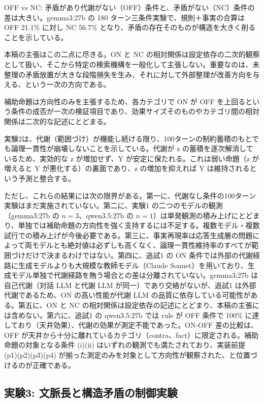 \documentclass[12pt,a4paper]{article}
\begin{document}
OFF vs NC: 矛盾があり代謝がない（OFF）条件と、矛盾がない（NC）条件の差は大きい。gemma3:27b の 180 ターン三条件実験で、規則＋事実の合算は OFF 21.1\% に対し NC 56.7\% となり、矛盾の存在そのものが構造を大きく削ることを示している。

本稿の主張はこの二点に尽きる。ON と NC の相対関係は設定依存の二次的観察として扱い、そこから特定の検索機構を一般化して主張しない。重要なのは、未整理の矛盾放置が大きな段階損失を生み、それに対して外部整理が改善方向を与える、という一次の方向である。

補助命題は方向性のみを主張するため、各カテゴリで ON が OFF を上回るという条件の成否が一次の検証項目であり、効果サイズそのものやカテゴリ間の相対関係は二次的な記述にとどまる。

実験2は、代謝（範囲づけ）が機能し続ける限り、100ターンの制約蓄積のもとでも論理一貫性が崩壊しないことを示している。代謝が z の蓄積を逐次解消しているため、実効的な z が増加せず、Y が安定に保たれる。これは弱い命題（z が増えると Y が悪化する）の裏面であり、z の増加を抑えれば Y は維持されるという予測と整合する。

ただし、これらの結果には次の限界がある。第一に、代謝なし条件の100ターン実験はまだ実施されていない。第二に、実験1 の二つのモデルの観測（gemma3:27b の \(n=3\)、qwen3.5:27b の \(n=1\)）は単発観測の積み上げにとどまり、単独では補助命題の方向性を強く支持するには不足する。複数モデル・複数試行での積み上げが今後必要である。第三に、事実再現率は応答生成層の問題によって両モデルとも絶対値は必ずしも高くなく、論理一貫性維持率のすべてが範囲づけだけで決まるわけではない。第四に、追試1 の ON 条件では外部の代謝経路に生成モデルよりも大規模な教師モデル（Claude Sonnet）を用いており、生成モデル単独で代謝経路を賄う場合との差は分離されていない。gemma3:27b は自己代謝（対話 LLM と代謝 LLM が同一）であり交絡がないが、追試1 は外部代謝であるため、ON の高い性能が代謝 LLM の品質に依存している可能性がある。第五に、ON と NC の相対関係は設定依存の記述にとどまり、本稿の主張には含めない。第六に、追試1 の qwen3.5:27b では rule が OFF 条件で 100\% に達しており（天井効果）、代謝の効果が測定不能であった。ON-OFF 差の比較は、OFF が天井から十分に離れているカテゴリ（contra、fact）に限定される。補助命題の対象となる条件 (i)(ii) はいずれの観測でも満たされており、実装前提 (p1)(p2)(p3)(p4) が揃った測定のみを対象として方向性が観察された、と位置づけるのが正確である。

\subsection{実験3: 文脈長と構造矛盾の制御実験}\label{ux5b9fux9a133-ux6587ux8108ux9577ux3068ux69cbux9020ux77dbux76feux306eux5236ux5fa1ux5b9fux9a13}
\end{document}

